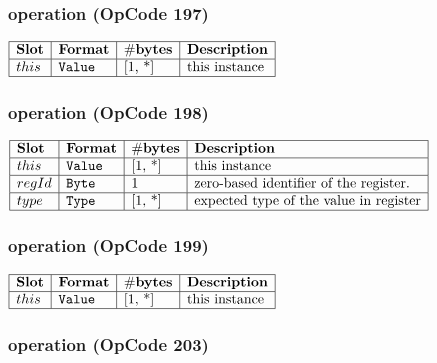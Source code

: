 \subsubsection{ operation (OpCode 197)}

\noindent
\(\begin{array}{| l | l | l | l |}
    \hline
    \bf{Slot} & \bf{Format} & \bf{\#bytes} & \bf{Description} \\
    \hline
         this & \lst{Value} & \text{[1, *]} & \text{this instance} \\
    \hline
      
\end{array}\)
       

\subsubsection{ operation (OpCode 198)}

\noindent
\(\begin{array}{| l | l | l | l |}
    \hline
    \bf{Slot} & \bf{Format} & \bf{\#bytes} & \bf{Description} \\
    \hline
         this & \lst{Value} & \text{[1, *]} & \text{this instance} \\
    \hline
           regId & \lst{Byte} & \text{1} & \text{zero-based identifier of the register.} \\
    \hline
           type & \lst{Type} & \text{[1, *]} & \text{expected type of the value in register} \\
    \hline
      
\end{array}\)
       

\subsubsection{ operation (OpCode 199)}

\noindent
\(\begin{array}{| l | l | l | l |}
    \hline
    \bf{Slot} & \bf{Format} & \bf{\#bytes} & \bf{Description} \\
    \hline
         this & \lst{Value} & \text{[1, *]} & \text{this instance} \\
    \hline
      
\end{array}\)
       

\subsubsection{ operation (OpCode 203)}

